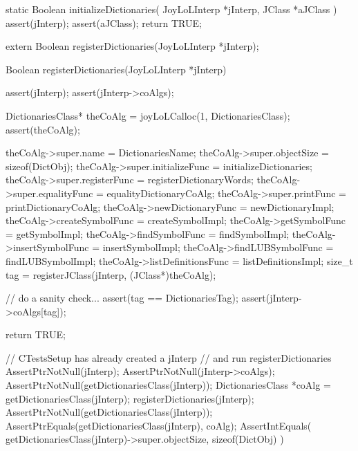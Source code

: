 \startCCode
static Boolean initializeDictionaries(
  JoyLoLInterp *jInterp,
  JClass       *aJClass
) {
  assert(jInterp);
  assert(aJClass);
  return TRUE;
}
\stopCCode

\startCHeader
extern Boolean registerDictionaries(JoyLoLInterp *jInterp);
\stopCHeader
{}

\startCCode
Boolean registerDictionaries(JoyLoLInterp *jInterp) {
  assert(jInterp);
  assert(jInterp->coAlgs);
  
  DictionariesClass* theCoAlg
    = joyLoLCalloc(1, DictionariesClass);
  assert(theCoAlg);
  
  theCoAlg->super.name           = DictionariesName;
  theCoAlg->super.objectSize     = sizeof(DictObj);
  theCoAlg->super.initializeFunc = initializeDictionaries;
  theCoAlg->super.registerFunc   = registerDictionaryWords;
  theCoAlg->super.equalityFunc   = equalityDictionaryCoAlg;
  theCoAlg->super.printFunc      = printDictionaryCoAlg;
  theCoAlg->newDictionaryFunc = newDictionaryImpl;
  theCoAlg->createSymbolFunc      = createSymbolImpl;
  theCoAlg->getSymbolFunc         = getSymbolImpl;
  theCoAlg->findSymbolFunc        = findSymbolImpl;
  theCoAlg->insertSymbolFunc      = insertSymbolImpl;
  theCoAlg->findLUBSymbolFunc     = findLUBSymbolImpl;
  theCoAlg->listDefinitionsFunc   = listDefinitionsImpl;  
  size_t tag =
    registerJClass(jInterp, (JClass*)theCoAlg);
  
  // do a sanity check...
  assert(tag == DictionariesTag);
  assert(jInterp->coAlgs[tag]);
   
  return TRUE;
}
\stopCCode


\startCTest
  // CTestsSetup has already created a jInterp
  // and run registerDictionaries
  AssertPtrNotNull(jInterp);
  AssertPtrNotNull(jInterp->coAlgs);
  AssertPtrNotNull(getDictionariesClass(jInterp));
  DictionariesClass *coAlg = getDictionariesClass(jInterp);
  registerDictionaries(jInterp);
  AssertPtrNotNull(getDictionariesClass(jInterp));
  AssertPtrEquals(getDictionariesClass(jInterp), coAlg);
  AssertIntEquals(
    getDictionariesClass(jInterp)->super.objectSize,
    sizeof(DictObj)
  )
\stopCTest
\stopTestCase
\stopTestSuite
